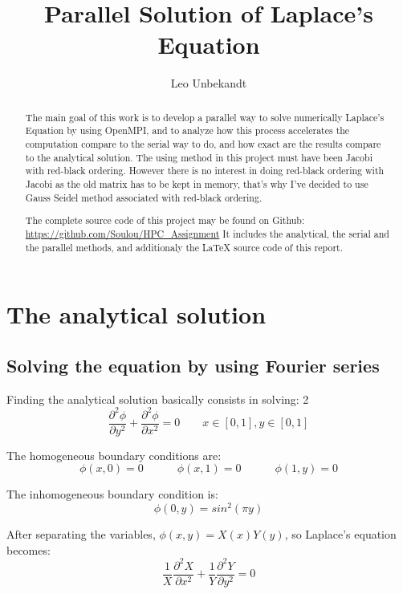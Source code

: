 \documentclass[a4paper,11pt]{article}
\title{Parallel Solution of Laplace's Equation}
\author{Leo Unbekandt}
\begin{document}
\maketitle
\tableofcontents

\begin{abstract}
  The main goal of this work is to develop a parallel way to solve numerically Laplace's Equation by using OpenMPI,
  and to analyze how this process accelerates the computation compare to the serial way to do, and how exact are the
  results compare to the analytical solution. The using method in this project must have been Jacobi with red-black
  ordering. However there is no interest in doing red-black ordering with Jacobi as the old matrix has to be kept in
  memory, that's why I've decided to use Gauss Seidel method associated with red-black ordering.
  
  The complete source code of this project may be found on Github: \url{https://github.com/Soulou/HPC_Assignment}
  It includes the analytical, the serial and the parallel methods, and additionaly the \LaTeX \hspace{5pt} source code of this
  report.
\end{abstract}

\section{The analytical solution}
\subsection{Solving the equation by using Fourier series}

Finding the analytical solution basically consists in solving:
2$$\frac{\partial^2 \phi}{\partial y^2} + \frac{\partial^2 \phi}{\partial x^2} = 0 \hspace{2em} x \in [0,1], y \in [0,1]$$

\noindent The homogeneous boundary conditions are:
$$\phi(x,0) = 0 \hspace{3em} \phi(x,1) = 0 \hspace{3em} \phi(1,y) = 0$$

\noindent The inhomogeneous boundary condition is:
$$\phi(0,y) = sin^2(\pi y)$$

\noindent After separating the variables, $\phi(x,y) = X(x)Y(y)$, so Laplace's equation becomes:
$$\frac{1}{X}\frac{\partial^2 X}{\partial x^2} + \frac{1}{Y}\frac{\partial^2 Y}{\partial y^2} = 0$$
\end{document}
